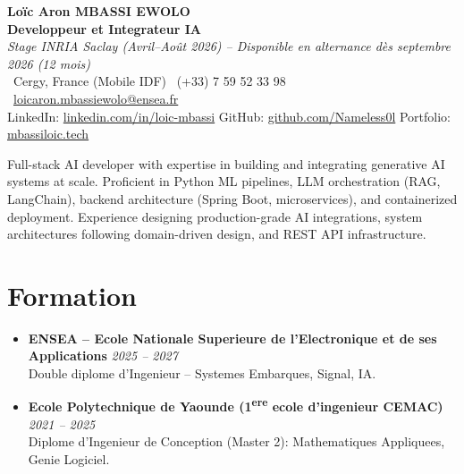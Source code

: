 \documentclass[a4paper,11pt]{article}
\begin{document}
\begin{center}
    {\Large \textbf{Lo\"ic Aron MBASSI EWOLO}} \\ \vspace{4pt}
    \textbf{\large Developpeur et Integrateur IA} \\
    \textit{\small Stage INRIA Saclay (Avril--Ao\^ut 2026) -- Disponible en alternance d\`es septembre 2026 (12 mois)} \\ \vspace{4pt}
    \small
    \Pointinghand\ Cergy, France (Mobile IDF) \quad
    \Mobilefone\ (+33) 7 59 52 33 98 \quad
    {\color{primary}\Letter\ \href{mailto:loicaron.mbassiewolo@ensea.fr}{loicaron.mbassiewolo@ensea.fr}} \\ \vspace{2pt}
    {\color{primary}LinkedIn: \href{https://www.linkedin.com/in/loic-mbassi/}{linkedin.com/in/loic-mbassi}} \quad
    {\color{primary}GitHub: \href{https://github.com/Nameless0l}{github.com/Nameless0l}} \quad
    {\color{primary}Portfolio: \href{https://mbassiloic.tech}{mbassiloic.tech}}
\end{center}
\vspace{-6pt}

\noindent\small{Full-stack AI developer with expertise in building and integrating generative AI systems at scale. Proficient in Python ML pipelines, LLM orchestration (RAG, LangChain), backend architecture (Spring Boot, microservices), and containerized deployment. Experience designing production-grade AI integrations, system architectures following domain-driven design, and REST API infrastructure.}

\section{Formation}
\begin{itemize}[leftmargin=*, label=\tiny$\bullet$, nosep]
    \item \textbf{ENSEA -- Ecole Nationale Superieure de l'Electronique et de ses Applications} \hfill \textit{2025 -- 2027} \\
    \small{Double diplome d'Ingenieur -- Systemes Embarques, Signal, IA.}
    \item \textbf{Ecole Polytechnique de Yaounde (1\textsuperscript{ere} ecole d'ingenieur CEMAC)} \hfill \textit{2021 -- 2025} \\
    \small{Diplome d'Ingenieur de Conception (Master 2): Mathematiques Appliquees, Genie Logiciel.}
\end{itemize}
\end{document}
